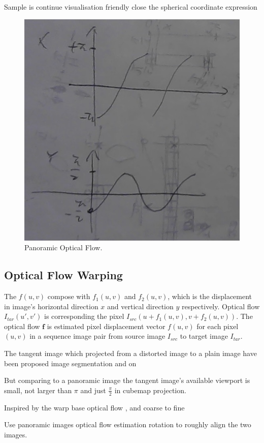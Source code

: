 Sample is continue 
visualisation friendly
close the spherical coordinate expression

\begin{figure}[hbt!]
	\centering
	\includegraphics[width=0.45\linewidth]{images/wrap-around-0.jpg}
	\caption{Panoramic Optical Flow.}
	\label{fig:app:warparound}
\end{figure}


\subsection{Optical Flow Warping}
\label{sec:approach:warping}

The $f(u,v)$ compose with $f_1(u,v)$ and $f_2(u,v)$, which is the displacement in image's horizontal direction $x$ and vertical direction $y$ respectively.
Optical flow 
$I_{tar}(u',v')$ is corresponding the pixel $I_{src}(u + f_1(u,v), v + f_2(u,v))$.
The optical flow $\textbf{f}$ is estimated pixel displacement vector $f(u,v)$ for each pixel $(u,v)$ in a sequence image pair from source image $I_{src}$ to target image $I_{tar}$.

The tangent image which projected from a distorted image to a plain image have been proposed image segmentation and on \cite{eldercvpr2020} 

But comparing to a panoramic image the tangent image's available viewport is small, not larger than $\pi$ and just $\frac{\pi}{2}$ in cubemap projection.

Inspired by the warp base optical flow \cite{?}, and coarse to fine 

Use panoramic images optical flow estimation rotation to roughly align the two images.


